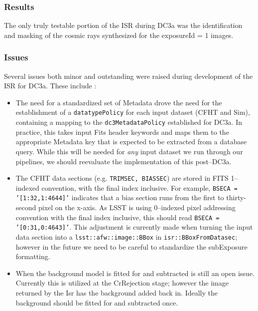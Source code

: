 \subsubsection{Results}

The only truly testable portion of the ISR during DC3a was the
identification and masking of the cosmic rays synthesized for the
exposureId = 1 images.  

\subsubsection{Issues}

Several issues both minor and outstanding were raised during
development of the ISR for DC3a.  These include :

\begin{itemize}

\item The need for a standardized set of Metadata drove the need for the 
establishment of a {\tt datatypePolicy} for each input dataset (CFHT
and Sim), containing a mapping to the {\tt dc3MetadataPolicy}
established for DC3a.  In practice, this takes input Fits header
keywords and maps them to the appropriate Metadata key that is
expected to be extracted from a database query.  While this will be
needed for {\it any} input dataset we run through our pipelines, we
should reevaluate the implementation of this post--DC3a.

\item The CFHT data sections (e.g. {\tt TRIMSEC, BIASSEC}) are stored
in FITS 1--indexed convention, with the final index inclusive.  For
example, {\tt BSECA = '[1:32,1:4644]'} indicates that a bias section
runs from the first to thirty-second pixel on the x-axis.  As LSST is
using 0--indexed pixel addressing convention with the final index
inclusive, this should read {\tt BSECA = '[0:31,0:4643]'}.  This
adjustment is currently made when turning the input data section into
a {\tt lsst::afw::image::BBox} in {\tt isr::BBoxFromDatasec}; however
in the future we need to be careful to standardize the subExposure
formatting.

\item When the background model is fitted for and 
subtracted is still an open issue.  Currently this is utilized at the
CrRejection stage; however the image returned by the Isr has the
background added back in.  Ideally the background should be fitted for
and subtracted once.


\end{itemize}
